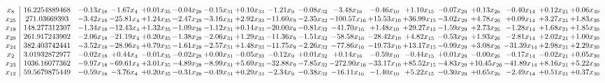 \documentclass[9pt]{article}
\begin{document}
 \[\begin{array}{c| c c@{\hskip 2pt} c@{\hskip 2pt} c@{\hskip 2pt} c@{\hskip 2pt} c@{\hskip 2pt} c@{\hskip 2pt} c@{\hskip 2pt} c@{\hskip 2pt} c@{\hskip 2pt} c@{\hskip 2pt} c@{\hskip 2pt} c@{\hskip 2pt} c@{\hskip 2pt} c@{\hskip 2pt} c@{\hskip 2pt} c@{\hskip 2pt} }
 x_{8}   &  16.2254889468 & -0.13 x_{18} & -1.67 x_{4} & +  0.01 x_{35} & -0.04 x_{28} & -0.15 x_{31} & +  0.10 x_{33} & -1.21 x_{9} & -0.08 x_{32} & -3.48 x_{16} & -0.46 x_{10} & +  1.10 x_{15} & -0.07 x_{29} & +  0.13 x_{26} & -0.40 x_{14} & +  0.12 x_{21} & +  0.06 x_{30}\\
 x_{25}   &  271.03669393 & -3.42 x_{18} & -25.81 x_{4} & +  1.24 x_{35} & -2.47 x_{28} & -3.16 x_{31} & +  2.92 x_{33} & -11.60 x_{9} & -2.35 x_{32} & -100.57 x_{16} & + 15.53 x_{10} & + 36.99 x_{15} & -3.02 x_{29} & +  4.78 x_{26} & +  0.09 x_{14} & +  3.27 x_{21} & +  1.83 x_{30}\\
 x_{19}   &  148.277312307 & -1.34 x_{18} & -12.43 x_{4} & +  1.32 x_{35} & -1.09 x_{28} & -1.12 x_{31} & +  0.14 x_{33} & -20.00 x_{9} & -0.81 x_{32} & -41.70 x_{16} & +  1.48 x_{10} & + 29.27 x_{15} & -1.59 x_{29} & +  2.73 x_{26} & -1.28 x_{14} & +  1.68 x_{21} & +  1.85 x_{30}\\
 x_{20}   &  261.917243902 & -2.06 x_{18} & -21.19 x_{4} & +  0.20 x_{35} & -1.38 x_{28} & -2.06 x_{31} & +  1.29 x_{33} & -11.36 x_{9} & -1.51 x_{32} & -58.58 x_{16} & -28.42 x_{10} & +  4.82 x_{15} & -0.53 x_{29} & +  1.93 x_{26} & -2.81 x_{14} & +  2.02 x_{21} & +  1.00 x_{30}\\
 x_{24}   &  382.403742441 & -3.52 x_{18} & -28.96 x_{4} & +  0.79 x_{35} & -1.61 x_{28} & -2.57 x_{31} & +  1.48 x_{33} & -11.75 x_{9} & -2.26 x_{32} & -77.86 x_{16} & -19.73 x_{10} & + 13.17 x_{15} & -0.99 x_{29} & +  3.08 x_{26} & -31.39 x_{14} & +  2.98 x_{21} & +  2.29 x_{30}\\
 x_{2}   &  3.01932872977 & -0.02 x_{18} & +  0.44 x_{4} & -0.01 x_{35} & -0.02 x_{28} & +  0.00 x_{31} & -0.05 x_{33} & -0.12 x_{9} & +  0.01 x_{32} & +  0.14 x_{16} & -0.59 x_{10} & -0.44 x_{15} & +  0.01 x_{29} & -0.00 x_{26} & -0.17 x_{14} & -0.02 x_{21} & +  0.05 x_{30}\\
 x_{23}   &  1036.16077362 & -9.97 x_{18} & -69.61 x_{4} & +  3.01 x_{35} & -4.89 x_{28} & -8.99 x_{31} & +  5.69 x_{33} & -32.88 x_{9} & -7.85 x_{32} & -272.90 x_{16} & -33.17 x_{10} & + 85.52 x_{15} & -4.83 x_{29} & + 10.45 x_{26} & -41.89 x_{14} & +  8.16 x_{21} & +  5.22 x_{30}\\
 x_{12}   &  59.5679875449 & -0.59 x_{18} & -3.76 x_{4} & +  0.20 x_{35} & -0.31 x_{28} & -0.49 x_{31} & +  0.29 x_{33} & -2.34 x_{9} & -0.38 x_{32} & -16.11 x_{16} & -1.40 x_{10} & +  5.22 x_{15} & -0.30 x_{29} & +  0.65 x_{26} & -2.49 x_{14} & +  0.51 x_{21} & +  0.37 x_{30}\\

\end{array}\]
\end{document}
